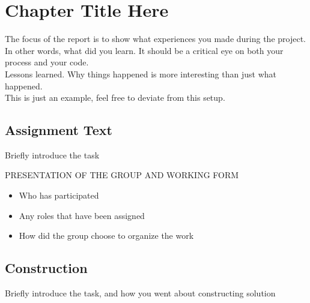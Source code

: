 
\chapter{Chapter Title Here} %

\label{ChapterX} %

The focus of the report is to show what experiences you made during the project.\\
In other words, what did you learn. It should be a critical eye on both your process and your code.\\
Lessons learned. Why things happened is more interesting than just what happened. \\

This is just an example, feel free to deviate from this setup. \\


\section{Assignment Text}

Briefly introduce the task

PRESENTATION OF THE GROUP AND WORKING FORM\\
\begin{itemize}
    \item Who has participated
    \item Any roles that have been assigned
    \item How did the group choose to organize the work
\end{itemize}


\section{Construction}

Briefly introduce the task, and how you went about constructing solution

